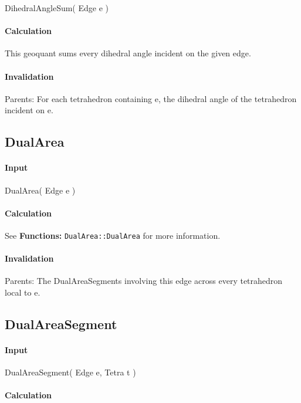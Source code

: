 DihedralAngleSum( Edge e )

\paragraph{Calculation}

This geoquant sums every dihedral angle incident on the given edge.

\paragraph{Invalidation}

\bigskip Parents: For each tetrahedron containing e, the dihedral angle of
the tetrahedron incident on e.

\subsection{DualArea}

\paragraph{Input}

DualArea( Edge e )

\paragraph{Calculation}

See \textbf{Functions: }\texttt{DualArea::DualArea} for more information.

\paragraph{Invalidation}

Parents: The DualAreaSegments involving this edge across every tetrahedron
local to e.

\bigskip

\subsection{DualAreaSegment}

\paragraph{Input}

DualAreaSegment( Edge e, Tetra t )

\paragraph{Calculation}

